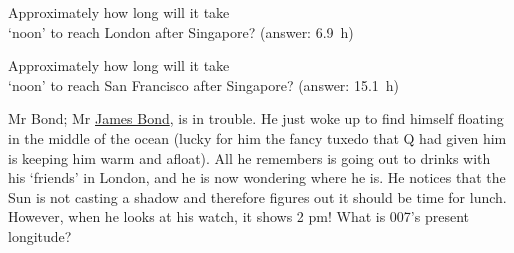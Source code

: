 \begin{enumerate}[\style (1)]\resume
	\begin{minipage}{0.475\linewidth}
		\item Approximately how long will it take\\ `noon' to reach London after Singapore?
		\abox{
			\scriptsize
			\[
			\begin{array}{R{0.55\linewidth}cl}
			Time taken by the Sun to `move' from one meridian to the next (i.e. to move by 1\degree) & = & 4~\text{min} \brk
			Number of meridians between Singapore \& London &= &103.9^{\circ}~\text{E}  - 0.3^{\circ}~\text{E} \\
			&=&103.6^{\circ}\\
			Time necessary for the Sun to move through $103.6^{\circ}$ & = & 4~\frac{\text{min} }{^{\circ}} \times 103.6^{\circ}\\
			&=&414.4~\text{min}\\
			&\approx&6.9~\text{h}
			\end{array}
			\]
		}
		\hfill\scriptsize(answer: 6.9~h)
	\end{minipage}
	\hspace{0.05\linewidth}
	\begin{minipage}{.475\linewidth}
		\item Approximately how long will it take\\ `noon' to reach San Francisco after Singapore?
		\abox{
			\scriptsize
			\[
			\begin{array}{R{0.55\linewidth}cl}
			Time taken by the Sun to `move' from one meridian to the next (i.e. to move by 1\degree) & = & 4~\text{min} \brk
			Number of meridians between Singapore \& San Francisco &= &103.9^{\circ}~\text{E}  + 122.4^{\circ}~\text{W} \\
			&=&226.3^{\circ}\\
			Time necessary for the Sun to move through $103.6^{\circ}$ & = & 4~\frac{\text{min} }{^{\circ}} \times 103.6^{\circ}\\
			&=&905.2~\text{min}\\
			&\approx&15.1~\text{h}
			\end{array}
			\]
		}
		\hfill\scriptsize(answer: 15.1~h)
	\end{minipage}
	
	\newpage
	
	\item Mr Bond; Mr \href{https://en.wikipedia.org/wiki/James_Bond}{James Bond}, is in trouble. He just woke up to find himself floating in the middle of the ocean (lucky for him the fancy tuxedo that Q had given him is keeping him warm and afloat). All he remembers is going out to drinks with his `friends' in London, and he is now wondering where he is. He notices that the Sun is not casting a shadow and therefore figures out it should be time for lunch. However, when he looks at his watch, it shows 2 pm! What is 007's present longitude?
	

\end{enumerate}
